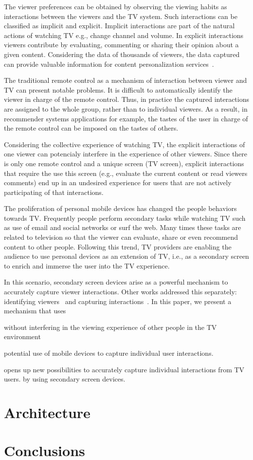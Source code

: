 \documentclass[conference,a4paper]{IEEEtran}
\begin{document}
The viewer preferences can be obtained by observing the viewing habits as interactions between the viewers and the TV system. Such interactions can be classified as implicit and explicit. Implicit interactions are part of the natural actions of watching TV e.g., change channel and volume. In explicit interactions viewers contribute by evaluating, commenting or sharing their opinion about a given content. Considering the data of thousands of viewers, the data captured can provide valuable information for content personalization services~\cite{Teixeira2010}.

The traditional remote control as a mechanism of interaction between viewer and TV can present notable problems. It is difficult to automatically identify the viewer in charge of the remote control. Thus, in practice the captured interactions are assigned to the whole group, rather than to individual viewers. As a result, in recommender systems applications for example, the tastes of the user in charge of the remote control can be imposed on the tastes of others.

Considering the collective experience of watching TV, the explicit interactions of one viewer can potencialy interfere in the experience of other viewers. Since there is only one remote control and a unique screen (TV screen), explicit interactions that require the use this screen (e.g., evaluate the current content or read viewers comments) end up in an undesired experience for users that are not actively participating of that interactions.

The proliferation of personal mobile devices has changed the people behaviors towards TV. Frequently people perform secondary tasks while watching TV such as use of email and social networks or surf the web. Many times these tasks are related to television so that the viewer can evaluate, share or even recommend content to other people. Following this trend, TV providers are enabling the audience to use personal devices as an extension of TV, i.e., as a secondary screen to enrich and immerse the user into the TV experience.

In this scenario, secondary screen devices arise as a powerful mechanism to accurately capture viewer interactions. Other works addressed this separately: identifying viewers~\cite{Cabarcos2011,Hwang2007} and capturing interactions~\cite{Teixeira2010}. In this paper, we present a mechanism that uses

 without interfering in the viewing experience of other people in the TV environment

potential use of mobile devices to capture individual user interactions.

opens up new possibilities to accurately capture individual interactions from TV users. by using secondary screen devices.

\section{Architecture}

\section{Conclusions}



\end{document}
